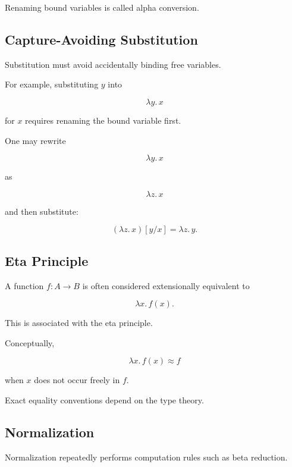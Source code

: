 Renaming bound variables is called alpha conversion.

\subsection{Capture-Avoiding Substitution}
\label{subsec:type-theory-substitution}

Substitution must avoid accidentally binding free variables.

For example, substituting \(y\) into

\[
\lambda y.\,x
\]

for \(x\) requires renaming the bound variable first.

One may rewrite

\[
\lambda y.\,x
\]

as

\[
\lambda z.\,x
\]

and then substitute:

\[
\boxed{
(\lambda z.\,x)[y/x]
=
\lambda z.\,y.
}
\]

\subsection{Eta Principle}
\label{subsec:eta-principle}

A function \(f:A\to B\) is often considered extensionally equivalent to

\[
\boxed{
\lambda x.\,f(x).
}
\]

This is associated with the eta principle.

Conceptually,

\[
\boxed{
\lambda x.\,f(x)
\approx
f
}
\]

when \(x\) does not occur freely in \(f\).

Exact equality conventions depend on the type theory.

\subsection{Normalization}
\label{subsec:type-theory-normalization}

Normalization repeatedly performs computation rules such as beta
reduction.

